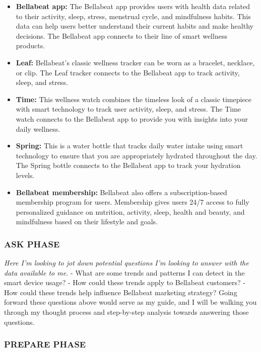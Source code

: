 \documentclass[
]{article}
\providecommand{\tightlist}{%
  \setlength{\itemsep}{0pt}\setlength{\parskip}{0pt}}
\begin{document}
\begin{itemize}
\tightlist
\item
  \textbf{Bellabeat app:} The Bellabeat app provides users with health
  data related to their activity, sleep, stress, menstrual cycle, and
  mindfulness habits. This data can help users better understand their
  current habits and make healthy decisions. The Bellabeat app connects
  to their line of smart wellness products.
\item
  \textbf{Leaf:} Bellabeat's classic wellness tracker can be worn as a
  bracelet, necklace, or clip. The Leaf tracker connects to the
  Bellabeat app to track activity, sleep, and stress.
\item
  \textbf{Time:} This wellness watch combines the timeless look of a
  classic timepiece with smart technology to track user activity, sleep,
  and stress. The Time watch connects to the Bellabeat app to provide
  you with insights into your daily wellness.
\item
  \textbf{Spring:} This is a water bottle that tracks daily water intake
  using smart technology to ensure that you are appropriately hydrated
  throughout the day. The Spring bottle connects to the Bellabeat app to
  track your hydration levels.
\item
  \textbf{Bellabeat membership:} Bellabeat also offers a
  subscription-based membership program for users. Membership gives
  users 24/7 access to fully personalized guidance on nutrition,
  activity, sleep, health and beauty, and mindfulness based on their
  lifestyle and goals.
\end{itemize}

\hypertarget{ask-phase}{%
\subsubsection{ASK PHASE}\label{ask-phase}}

\emph{Here I'm looking to jot down potential questions I'm looking to
answer with the data available to me.} - What are some trends and
patterns I can detect in the smart device usage? - How could these
trends apply to Bellabeat customers? - How could these trends help
influence Bellabeat marketing strategy? Going forward these questions
above would serve as my guide, and I will be walking you through my
thought process and step-by-step analysis towards answering those
questions.

\hypertarget{prepare-phase}{%
\subsubsection{PREPARE PHASE}\label{prepare-phase}}
\end{document}
